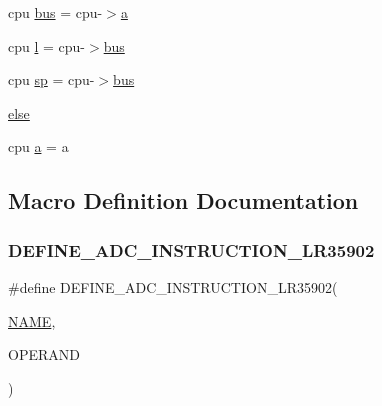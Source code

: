 \begin{DoxyCompactItemize}
\item 
cpu \mbox{\hyperlink{isa-lr35902_8c_a6163e7e073b87ad067db0a3b10da6be9}{bus}} = cpu-\/$>$\mbox{\hyperlink{isa-lr35902_8c_a7015284d2957ab7cdf82d2535a2fa547}{a}}
\item 
cpu \mbox{\hyperlink{isa-lr35902_8c_af12785b4fbc4858d3685aad0d49fdce6}{l}} = cpu-\/$>$\mbox{\hyperlink{isa-lr35902_8c_a6163e7e073b87ad067db0a3b10da6be9}{bus}}
\item 
cpu \mbox{\hyperlink{isa-lr35902_8c_a2a917b9f439b612ee0161cab4c4d0568}{sp}} = cpu-\/$>$\mbox{\hyperlink{isa-lr35902_8c_a6163e7e073b87ad067db0a3b10da6be9}{bus}}
\item 
\mbox{\hyperlink{isa-lr35902_8c_a0544c3fe466e421738dae463968b70ba}{else}}
\item 
cpu \mbox{\hyperlink{isa-lr35902_8c_a7015284d2957ab7cdf82d2535a2fa547}{a}} = a
\end{DoxyCompactItemize}


\subsection{Macro Definition Documentation}
\mbox{\label{isa-lr35902_8c_a7bdd6800892d58bcaa0e239dfb95b5ff}} 
\subsubsection{\texorpdfstring{D\+E\+F\+I\+N\+E\+\_\+\+A\+D\+C\+\_\+\+I\+N\+S\+T\+R\+U\+C\+T\+I\+O\+N\+\_\+\+L\+R35902}{DEFINE\_ADC\_INSTRUCTION\_LR35902}}
{\footnotesize\ttfamily \#define D\+E\+F\+I\+N\+E\+\_\+\+A\+D\+C\+\_\+\+I\+N\+S\+T\+R\+U\+C\+T\+I\+O\+N\+\_\+\+L\+R35902(\begin{DoxyParamCaption}\item[{}]{\mbox{\hyperlink{inflate_8h_a164ea0159d5f0b5f12a646f25f99eceaa67bc2ced260a8e43805d2480a785d312}{N\+A\+ME}},  }\item[{}]{O\+P\+E\+R\+A\+ND }\end{DoxyParamCaption})}

